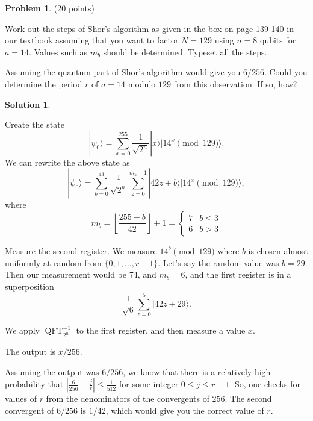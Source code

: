 \documentclass{article}
\theoremstyle{definition}
\newtheorem{problem}{Problem}
\newtheorem*{solution}{Solution}
\DeclareMathOperator{\QFT}{QFT}
\newcommand{\ket}[1]{|#1\rangle}
\begin{document}
\begin{problem} (20 points)
\begin{compactenum}[(a)]
\item Work out the steps of Shor's algorithm as given in the box on page 139-140 in our textbook assuming that you want to factor $N=129$ using $n=8$ qubits for $a=14$. Values such as $m_b$ should be determined. Typeset all the steps. 
\item Assuming the quantum part of Shor's algorithm would give you $6/256$. Could you determine the period $r$ of $a=14$ modulo $129$ from this observation. If so, how? 
\end{compactenum}
\end{problem}
\begin{solution}
\begin{compactenum}[1.]
\item Create the state 
$$ \ket{\psi_0} = \sum_{x = 0}^{255} \frac{1}{\sqrt{2^n}} \ket{x} \ket{14^x \pmod{129}}. $$
We can rewrite the above state as
$$ \ket{\psi_0} = \sum_{b = 0}^{41} \frac{1}{\sqrt{2^n}} \sum_{z=0}^{m_b-1} \ket{42 z + b} \ket{14^x \pmod{129}}, $$
where $$m_b  = \left \lfloor \frac{255 - b  }{42} \right \rfloor + 1 = 
\begin{cases}
7 & b \le 3 \\
6 & b > 3
\end{cases}
$$
\item Measure the second register.  We measure $14^b \pmod{129}$ where $b$ is chosen almost uniformly at random from $\{0, 1, \ldots, r-1\}$.  Let's say the random value
was $b = 29$.  Then our measurement would be $74$, and $m_b = 6$, and the first register is in a superposition
$$\frac{1}{\sqrt 6} \sum_{z = 0}^5 \ket{42z + 29}.$$

\item We apply $\QFT_{2^n}^{-1}$ to the first register, and then measure a value $x$.  
\item The output is $x/256$. 
\end{compactenum}
Assuming the output was $6/256$, we know that there is a relatively high probability that $\left| \frac{6}{256} - \frac{j}{r} \right| \le \frac{1}{512}$ for some integer $0 \le j \le r-1$.  So, one checks for values of $r$ from the denominators of the convergents of $256$. The second convergent of $6/256$ is $1/42$, which would give you the correct value of $r$.
\end{solution}
\end{document}
